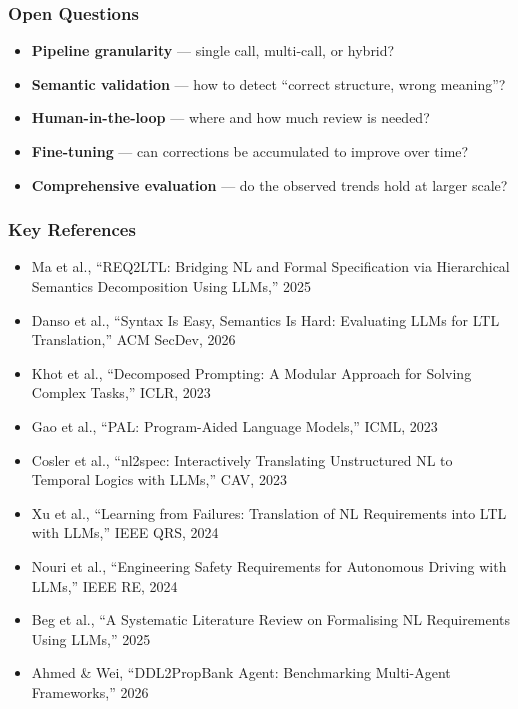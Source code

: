 \begin{frame}
  \frametitle{Open Questions}

  \begin{itemize}
    \item \textbf{Pipeline granularity} — single call, multi-call, or hybrid?

    \bigskip
    \item \textbf{Semantic validation} — how to detect ``correct structure, wrong meaning''?

    \bigskip
    \item \textbf{Human-in-the-loop} — where and how much review is needed?

    \bigskip
    \item \textbf{Fine-tuning} — can corrections be accumulated to improve over time?

    \bigskip
    \item \textbf{Comprehensive evaluation} — do the observed trends hold at larger scale?
  \end{itemize}
\end{frame}



\begin{frame}
  \frametitle{Key References}
  \scriptsize
  \begin{itemize}
    \item Ma et al., ``REQ2LTL: Bridging NL and Formal Specification
    via Hierarchical Semantics Decomposition Using LLMs,'' 2025
    \item Danso et al., ``Syntax Is Easy, Semantics Is Hard:
    Evaluating LLMs for LTL Translation,'' ACM SecDev, 2026
    \item Khot et al., ``Decomposed Prompting: A Modular Approach
    for Solving Complex Tasks,'' ICLR, 2023
    \item Gao et al., ``PAL: Program-Aided Language Models,''
    ICML, 2023
    \item Cosler et al., ``nl2spec: Interactively Translating
    Unstructured NL to Temporal Logics with LLMs,'' CAV, 2023
    \item Xu et al., ``Learning from Failures: Translation of NL
    Requirements into LTL with LLMs,'' IEEE QRS, 2024
    \item Nouri et al., ``Engineering Safety Requirements for
    Autonomous Driving with LLMs,'' IEEE RE, 2024
    \item Beg et al., ``A Systematic Literature Review on
    Formalising NL Requirements Using LLMs,'' 2025
    \item Ahmed \& Wei, ``DDL2PropBank Agent: Benchmarking
    Multi-Agent Frameworks,'' 2026
  \end{itemize}
\end{frame}


